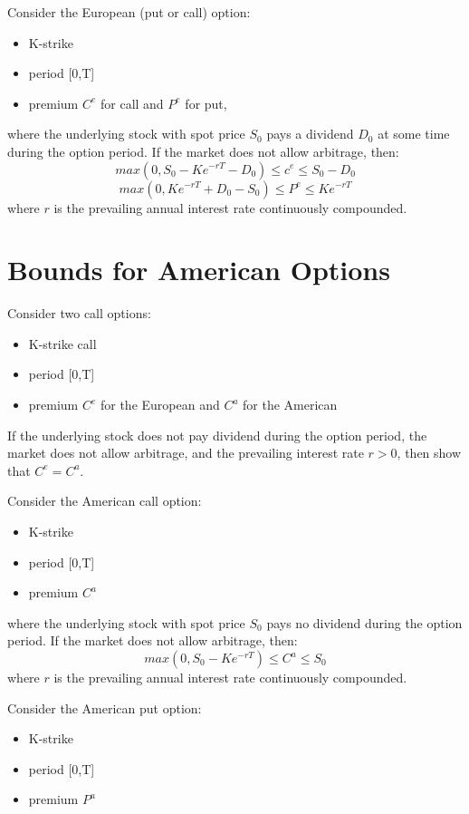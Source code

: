 \documentclass{report}
\begin{document}
Consider the European (put or call) option:
\begin{itemize}
    \item K-strike
    \item period [0,T]
    \item premium $C^e$ for call and $P^e$ for put,
\end{itemize}

where the underlying stock with spot price $S_0$ pays a dividend $D_0$ at some time during the option period. If the market does not allow arbitrage, then:
\[max(0, S_0-Ke^{-rT}-D_0) \leq c^e \leq S_0-D_0\]
\[max(0, Ke^{-rT}+D_0-S_0) \leq P^e \leq Ke^{-rT}\]
where $r$ is the prevailing annual interest rate continuously compounded.



\section{Bounds for American Options}
Consider two call options:
\begin{itemize}
    \item K-strike call
    \item period [0,T]
    \item premium $C^e$ for the European and $C^a$ for the American
\end{itemize}

If the underlying stock does not pay dividend during the option period, the market does not allow arbitrage, and the prevailing interest rate $r > 0$, then show that $C^e = C^a$.


Consider the American call option:
\begin{itemize}
    \item K-strike
    \item period [0,T]
    \item premium $C^a$
\end{itemize}

where the underlying stock with spot price $S_0$ pays no dividend during the option period. If the market does not allow arbitrage, then:
\[max(0, S_0-Ke^{-rT}) \leq C^a \leq S_0\]
where $r$ is the prevailing annual interest rate continuously compounded.


Consider the American put option:
\begin{itemize}
    \item K-strike
    \item period [0,T]
    \item premium $P^a$
\end{itemize}
\end{document}
